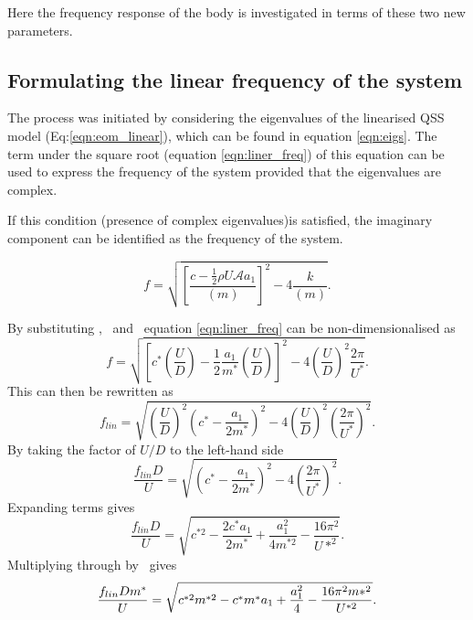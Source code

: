 Here the frequency response of the body is investigated in terms of these two new parameters.

\subsection{Formulating the linear frequency of the system}

The process was initiated by considering the eigenvalues of the linearised QSS model (Eq:\ref{eqn:eom_linear}), which can be found in equation \ref{eqn:eigs}. The term under the square root (equation \ref{eqn:liner_freq}) of this equation can be used to express the frequency of the system provided that the eigenvalues are complex. 

If this condition (presence of complex eigenvalues)is satisfied, the imaginary component can be identified as the frequency of the system. 

\begin{equation}
\label{eqn:liner_freq}
f = \sqrt{\left[\frac{c-\frac{1}{2}\rho U\mathcal{A}a_1}{(m)}\right]^2-4\frac{k}{(m)}}.
\end{equation}



By substituting \cstar, \mstar\ and \ustar\ equation \ref{eqn:liner_freq} can be non-dimensionalised as
%
\begin{equation}
f = \sqrt{\left[c^*\left(\frac{U}{D}\right) - \frac{1}{2}\frac{a_1}{m^*}\left(\frac{U}{D}\right)\right]^2 - 4\left(\frac{U}{D}\right)^2\frac{2\pi}{U^*}}.
\end{equation}
%
This can then be rewritten as
\begin{equation}
f_{lin} = \sqrt{\left(\frac{U}{D}\right)^2\left(c^*-\frac{a_1}{2m^*}\right)^2 - 4\left(\frac{U}{D}\right)^2\left(\frac{2\pi}{U^*}\right)^2}.
\end{equation}
By taking the factor of $U/D$ to the left-hand side
\begin{equation}
\frac{f_{lin}D}{U} = \sqrt{\left(c^*-\frac{a_1}{2m^*}\right)^2 - 4\left(\frac{2\pi}{U^*}\right)^2}.
\end{equation}
Expanding terms gives
\begin{equation}
\frac{f_{lin}D}{U} = \sqrt{c^{*2} - \frac{2c^*a_1}{2m^*} + \frac{a_1^2}{4m^{*2}} - \frac{16\pi^2}{U*^2}}.
\end{equation}
Multiplying through by \mstar\ gives
\begin{equation}
\frac{f_{lin}Dm^{*}}{U} = \sqrt{c^{*2}m^{*2} - c^*m^*a_1 + \frac{a_1^2}{4} - \frac{16\pi^2m{*^2}}{U^{*2}}}.
\end{equation}


